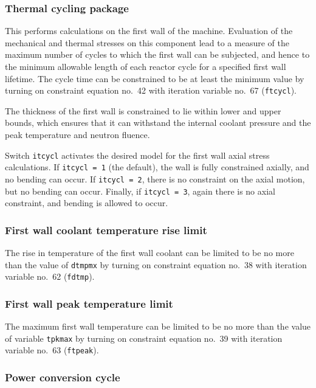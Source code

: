 \documentclass[11pt,a4paper]{report}
\begin{document}
\subsubsection{Thermal cycling package}
This performs calculations on the first wall of the machine. Evaluation of the
mechanical and thermal stresses on this component lead to a measure of the
maximum number of cycles to which the first wall can be subjected, and hence
to the minimum allowable length of each reactor cycle for a specified first
wall lifetime. The cycle time can be constrained to be at least the minimum
value by turning on constraint equation no.\ 42 with iteration variable no.\
67 (\texttt{ftcycl}).

The thickness of the first wall is constrained to lie within lower and upper
bounds, which ensures that it can withstand the internal coolant pressure and
the peak temperature and neutron fluence.

Switch \texttt{itcycl} activates the desired model for the first wall axial
stress calculations. If \texttt{itcycl = 1} (the default), the wall is fully
constrained axially, and no bending can occur. If \texttt{itcycl = 2}, there
is no constraint on the axial motion, but no bending can occur. Finally, if
\texttt{itcycl = 3}, again there is no axial constraint, and bending is
allowed to occur.

\subsubsection{First wall coolant temperature rise limit}

The rise in temperature of the first wall coolant can be limited to be no more
than the value of \texttt{dtmpmx} by turning on constraint equation no.\ 38 with
iteration variable no.\ 62 (\texttt{fdtmp}).

\subsubsection{First wall peak temperature limit}

The maximum first wall temperature can be limited to be no more than the value
of variable \texttt{tpkmax} by turning on constraint equation no.\ 39 with
iteration variable no.\ 63 (\texttt{ftpeak}).


\subsubsection{Power conversion cycle}
\label{sec:etath}
\end{document}
